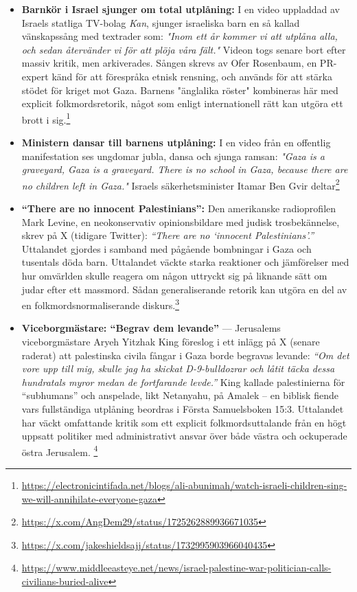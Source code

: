 \begin{itemize}
\item \textbf{Barnkör i Israel sjunger om total utplåning:} I en video uppladdad av Israels statliga TV-bolag \textit{Kan}, sjunger israeliska barn en så kallad vänskapssång med textrader som: \textit{"Inom ett år kommer vi att utplåna alla, och sedan återvänder vi för att plöja våra fält."} Videon togs senare bort efter massiv kritik, men arkiverades. Sången skrevs av Ofer Rosenbaum, en PR-expert känd för att förespråka etnisk rensning, och används för att stärka stödet för kriget mot Gaza. Barnens "änglalika röster" kombineras här med explicit folkmordsretorik, något som enligt internationell rätt kan utgöra ett brott i sig.\footnote{\url{https://electronicintifada.net/blogs/ali-abunimah/watch-israeli-children-sing-we-will-annihilate-everyone-gaza}}

\item \textbf{Ministern dansar till barnens utplåning:} I en video från en offentlig manifestation ses ungdomar jubla, dansa och sjunga ramsan: \textit{"Gaza is a graveyard, Gaza is a graveyard. There is no school in Gaza, because there are no children left in Gaza."} Israels säkerhetsminister Itamar Ben Gvir deltar\footnote{\url{https://x.com/AngDem29/status/1725262889936671035}}

\item \textbf{“There are no innocent Palestinians”:} Den amerikanske radioprofilen Mark Levine, en neokonservativ opinionsbildare med judisk trosbekännelse, skrev på X (tidigare Twitter): \textit{“There are no ‘innocent Palestinians’.”} Uttalandet gjordes i samband med pågående bombningar i Gaza och tusentals döda barn. Uttalandet väckte starka reaktioner och jämförelser med hur omvärlden skulle reagera om någon uttryckt sig på liknande sätt om judar efter ett massmord. Sådan generaliserande retorik kan utgöra en del av en folkmordsnormaliserande diskurs.\footnote{\url{https://x.com/jakeshieldsajj/status/1732995903966040435}}

\item \textbf{Viceborgmästare: “Begrav dem levande”} — Jerusalems viceborgmästare Aryeh Yitzhak King föreslog i ett inlägg på X (senare raderat) att palestinska civila fångar i Gaza borde begravas levande: \textit{“Om det vore upp till mig, skulle jag ha skickat D-9-bulldozrar och låtit täcka dessa hundratals myror medan de fortfarande levde.”} King kallade palestinierna för “subhumans” och anspelade, likt Netanyahu, på Amalek – en biblisk fiende vars fullständiga utplåning beordras i Första Samuelsboken 15:3. Uttalandet har väckt omfattande kritik som ett explicit folkmordsuttalande från en högt uppsatt politiker med administrativt ansvar över både västra och ockuperade östra Jerusalem. \footnote{\url{https://www.middleeasteye.net/news/israel-palestine-war-politician-calls-civilians-buried-alive}}


\end{itemize}
